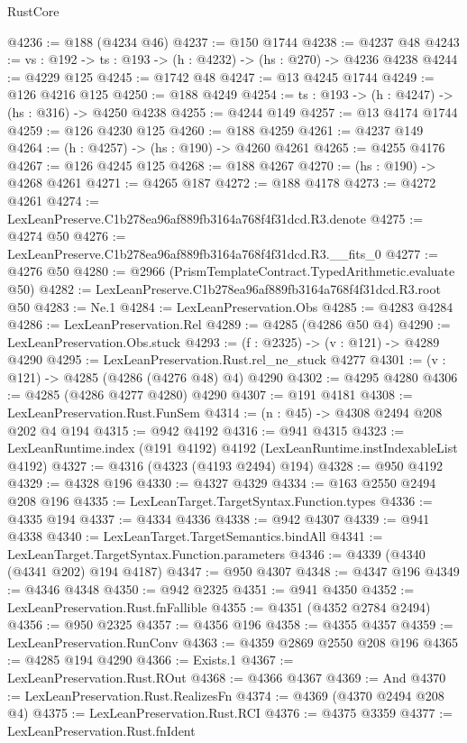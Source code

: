 \begin{lexlean}{RustCore}
\begin{coremodule}
@4236 := @188 (@4234 @46)
@4237 := @150 @1744
@4238 := @4237 @48
@4243 := {vs : @192} -> {ts : @193} -> (h : @4232) -> (hs : @270) -> @4236 @4238
@4244 := @4229 @125
@4245 := @1742 @48
@4247 := @13 @4245 @1744
@4249 := @126 @4216 @125
@4250 := @188 @4249
@4254 := {ts : @193} -> (h : @4247) -> (hs : @316) -> @4250 @4238
@4255 := @4244 @149
@4257 := @13 @4174 @1744
@4259 := @126 @4230 @125
@4260 := @188 @4259
@4261 := @4237 @149
@4264 := (h : @4257) -> (hs : @190) -> @4260 @4261
@4265 := @4255 @4176
@4267 := @126 @4245 @125
@4268 := @188 @4267
@4270 := (hs : @190) -> @4268 @4261
@4271 := @4265 @187
@4272 := @188 @4178
@4273 := @4272 @4261
@4274 := LexLeanPreserve.C1b278ea96af889fb3164a768f4f31dcd.R3.denote
@4275 := @4274 @50
@4276 := LexLeanPreserve.C1b278ea96af889fb3164a768f4f31dcd.R3.__fits_0
@4277 := @4276 @50
@4280 := @2966 (PrismTemplateContract.TypedArithmetic.evaluate @50)
@4282 := LexLeanPreserve.C1b278ea96af889fb3164a768f4f31dcd.R3.root @50
@4283 := Ne.{1}
@4284 := LexLeanPreservation.Obs
@4285 := @4283 @4284
@4286 := LexLeanPreservation.Rel
@4289 := @4285 (@4286 @50 @4)
@4290 := LexLeanPreservation.Obs.stuck
@4293 := (f : @2325) -> (v : @121) -> @4289 @4290
@4295 := LexLeanPreservation.Rust.rel_ne_stuck @4277
@4301 := (v : @121) -> @4285 (@4286 (@4276 @48) @4) @4290
@4302 := @4295 @4280
@4306 := @4285 (@4286 @4277 @4280) @4290
@4307 := @191 @4181
@4308 := LexLeanPreservation.Rust.FunSem
@4314 := (n : @45) -> @4308 @2494 @208 @202 @4 @194
@4315 := @942 @4192
@4316 := @941 @4315
@4323 := LexLeanRuntime.index (@191 @4192) @4192 (LexLeanRuntime.instIndexableList @4192)
@4327 := @4316 (@4323 (@4193 @2494) @194)
@4328 := @950 @4192
@4329 := @4328 @196
@4330 := @4327 @4329
@4334 := @163 @2550 @2494 @208 @196
@4335 := LexLeanTarget.TargetSyntax.Function.types
@4336 := @4335 @194
@4337 := @4334 @4336
@4338 := @942 @4307
@4339 := @941 @4338
@4340 := LexLeanTarget.TargetSemantics.bindAll
@4341 := LexLeanTarget.TargetSyntax.Function.parameters
@4346 := @4339 (@4340 (@4341 @202) @194 @4187)
@4347 := @950 @4307
@4348 := @4347 @196
@4349 := @4346 @4348
@4350 := @942 @2325
@4351 := @941 @4350
@4352 := LexLeanPreservation.Rust.fnFallible
@4355 := @4351 (@4352 @2784 @2494)
@4356 := @950 @2325
@4357 := @4356 @196
@4358 := @4355 @4357
@4359 := LexLeanPreservation.RunConv
@4363 := @4359 @2869 @2550 @208 @196
@4365 := @4285 @194 @4290
@4366 := Exists.{1}
@4367 := LexLeanPreservation.Rust.ROut
@4368 := @4366 @4367
@4369 := And
@4370 := LexLeanPreservation.Rust.RealizesFn
@4374 := @4369 (@4370 @2494 @208 @4)
@4375 := LexLeanPreservation.Rust.RCI
@4376 := @4375 @3359
@4377 := LexLeanPreservation.Rust.fnIdent

\end{coremodule}
\end{lexlean}
